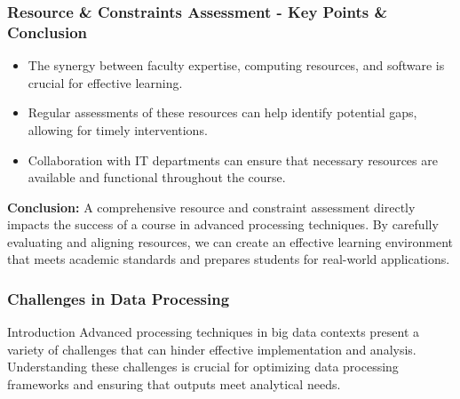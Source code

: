 \documentclass[aspectratio=169]{beamer}
\begin{document}
\begin{frame}[fragile]
    \frametitle{Resource \& Constraints Assessment - Key Points \& Conclusion}
    \begin{itemize}
        \item The synergy between faculty expertise, computing resources, and software is crucial for effective learning.
        \item Regular assessments of these resources can help identify potential gaps, allowing for timely interventions.
        \item Collaboration with IT departments can ensure that necessary resources are available and functional throughout the course.
    \end{itemize}
    
    \textbf{Conclusion:} A comprehensive resource and constraint assessment directly impacts the success of a course in advanced processing techniques. By carefully evaluating and aligning resources, we can create an effective learning environment that meets academic standards and prepares students for real-world applications.
\end{frame}

\begin{frame}[fragile]
    \frametitle{Challenges in Data Processing}
    
    \begin{block}{Introduction}
        Advanced processing techniques in big data contexts present a variety of challenges that can hinder effective implementation and analysis. Understanding these challenges is crucial for optimizing data processing frameworks and ensuring that outputs meet analytical needs.
    \end{block}
\end{frame}
\end{document}
